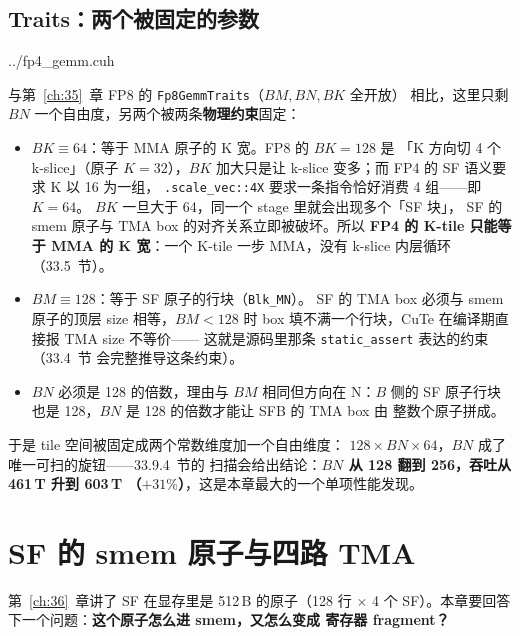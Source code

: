 \subsection{Traits：两个被固定的参数}\label{sec:37-traits}

\begin{lstinputlisting}[linerange={554-584},firstnumber=auto,
  title={fp4\_gemm.cuh L554-584（Fp4GemmTraits：tile 几何与 static\_assert）}]{../fp4_gemm.cuh}
\end{lstinputlisting}

与第~\ref{ch:35}~章 FP8 的 \texttt{Fp8GemmTraits}（$BM,BN,BK$ 全开放）
相比，这里只剩 $BN$ 一个自由度，另两个被两条\textbf{物理约束}固定：

\begin{itemize}[itemsep=2pt,topsep=3pt]
  \item $BK \equiv 64$：等于 MMA 原子的 K 宽。FP8 的 $BK{=}128$ 是
        「K 方向切 4 个 k-slice」（原子 $K{=}32$），$BK$ 加大只是让
        k-slice 变多；而 FP4 的 SF 语义要求 K 以 16 为一组，
        \texttt{.scale\_vec::4X} 要求一条指令恰好消费 4 组——即 $K{=}64$。
        $BK$ 一旦大于 64，同一个 stage 里就会出现多个「SF 块」，
        SF 的 smem 原子与 TMA box 的对齐关系立即被破坏。所以
        \textbf{FP4 的 K-tile 只能等于 MMA 的 K 宽}：一个 K-tile
        一步 MMA，没有 k-slice 内层循环（33.5~节）。
  \item $BM \equiv 128$：等于 SF 原子的行块（\texttt{Blk\_MN}）。
        SF 的 TMA box 必须与 smem 原子的顶层 size 相等，$BM<128$ 时
        box 填不满一个行块，CuTe 在编译期直接报 TMA size 不等价——
        这就是源码里那条 \texttt{static\_assert} 表达的约束（33.4~节
        会完整推导这条约束）。
  \item $BN$ 必须是 128 的倍数，理由与 $BM$ 相同但方向在 N：$B$ 侧的 SF
        原子行块也是 128，$BN$ 是 128 的倍数才能让 SFB 的 TMA box 由
        整数个原子拼成。
\end{itemize}

于是 tile 空间被固定成两个常数维度加一个自由维度：
$128 \times BN \times 64$，$BN$ 成了唯一可扫的旋钮——33.9.4~节的
扫描会给出结论：\textbf{$BN$ 从 128 翻到 256，吞吐从 461\,T 升到 603\,T
（$+31\%$）}，这是本章最大的一个单项性能发现。

\section{SF 的 smem 原子与四路 TMA}\label{sec:37-sf}

第~\ref{ch:36}~章讲了 SF 在显存里是 512\,B 的原子（128 行 $\times$ 4 个
SF）。本章要回答下一个问题：\textbf{这个原子怎么进 smem，又怎么变成
寄存器 fragment？}

